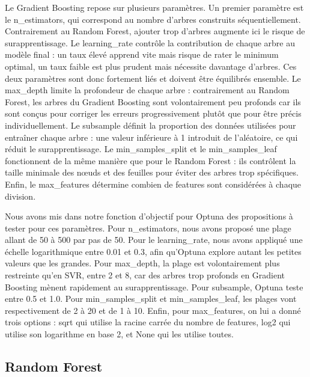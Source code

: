 \documentclass[mstat,12pt]{unswthesis}
\begin{document}
Le Gradient Boosting repose sur plusieurs paramètres. Un premier paramètre est le n\_estimators, qui correspond au nombre d'arbres construits séquentiellement. Contrairement au Random Forest, ajouter trop d'arbres augmente ici le risque de surapprentissage. Le learning\_rate contrôle la contribution de chaque arbre au modèle final : un taux élevé apprend vite mais risque de rater le minimum optimal, un taux faible est plus prudent mais nécessite davantage d'arbres. Ces deux paramètres sont donc fortement liés et doivent être équilibrés ensemble. Le max\_depth limite la profondeur de chaque arbre : contrairement au Random Forest, les arbres du Gradient Boosting sont volontairement peu profonds car ils sont conçus pour corriger les erreurs progressivement plutôt que pour être précis individuellement. Le subsample définit la proportion des données utilisées pour entraîner chaque arbre : une valeur inférieure à 1 introduit de l'aléatoire, ce qui réduit le surapprentissage. Le min\_samples\_split et le min\_samples\_leaf fonctionnent de la même manière que pour le Random Forest : ils contrôlent la taille minimale des nœuds et des feuilles pour éviter des arbres trop spécifiques. Enfin, le max\_features détermine combien de features sont considérées à chaque division.

Nous avons mis dans notre fonction d'objectif pour Optuna des propositions à tester pour ces paramètres. Pour n\_estimators, nous avons proposé une plage allant de 50 à 500 par pas de 50. Pour le learning\_rate, nous avons appliqué une échelle logarithmique entre 0.01 et 0.3, afin qu'Optuna explore autant les petites valeurs que les grandes. Pour max\_depth, la plage est volontairement plus restreinte qu'en SVR, entre 2 et 8, car des arbres trop profonds en Gradient Boosting mènent rapidement au surapprentissage. Pour subsample, Optuna teste entre 0.5 et 1.0. Pour min\_samples\_split et min\_samples\_leaf, les plages vont respectivement de 2 à 20 et de 1 à 10. Enfin, pour max\_features, on lui a donné trois options : sqrt qui utilise la racine carrée du nombre de features, log2 qui utilise son logarithme en base 2, et None qui les utilise toutes. \\


\subsection{\textbf{Random Forest}}
\end{document}
